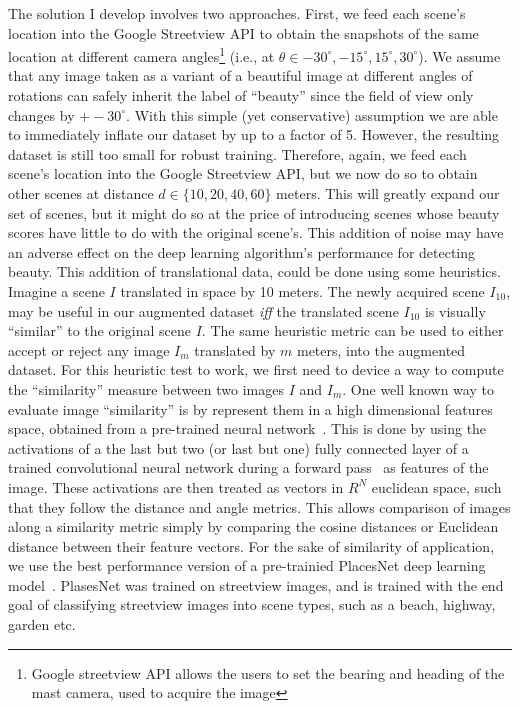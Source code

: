 The solution I develop involves two approaches. First, we feed each scene's location into the Google Streetview API to obtain the snapshots of the same location at different camera angles\footnote{Google streetview API allows the users to set the bearing and heading of the mast camera, used to acquire the image} (i.e., at $\theta \in {-30^{\circ}, -15^{\circ} , 15^{\circ} , 30^{\circ} }$). We assume that any image taken as a variant of a beautiful image at different angles of rotations can safely inherit the label of ``beauty'' since the field of view only changes by $+- 30^\circ $. With this simple (yet conservative) assumption we are able to immediately inflate our dataset by up to a factor of 5.
However, the resulting dataset is still too small for robust training. Therefore, again, we feed each scene's location into the Google Streetview API, but we now do so to obtain other scenes at  distance $d \in \{10,20,40,60\}$ meters.  This will greatly expand our set of scenes, but it might do so at the price of introducing scenes whose beauty scores have little to do with the original scene's. 
This addition of noise may have an adverse effect on the deep learning algorithm's performance for detecting beauty. 
This addition of translational data, could be done using some heuristics. Imagine a scene $I$ translated in space by 10 meters. The newly acquired scene $I_{10}$, may be useful in our augmented dataset \textit{iff} the translated scene $I_{10}$ is visually ``similar'' to the original scene $I$. The same heuristic metric can be used to either accept or reject any image $I_{m}$ translated by $m$ meters, into the augmented dataset. 
For this heuristic test to work, we first need to device a way to compute the ``similarity'' measure between two images $I$ and $I_{m}$. 
One well known way to evaluate image ``similarity'' is by represent them in a high dimensional features space, obtained from a pre-trained neural network~\cite{zhang2018unreasonable}. This is done by using the activations of a the last but two (or last but one) fully connected layer of a trained convolutional neural network during a forward pass~\cite{babenko2015aggregating,Lin_2015_CVPR_Workshops,varga2016fast} as features of the image. These activations are then treated as vectors in $R^N$ euclidean space, such that they follow the distance and angle metrics. This allows comparison of images along a similarity metric simply by comparing the cosine distances or Euclidean distance between their feature vectors. For the sake of similarity of application, we use the best performance version of a pre-trainied PlacesNet deep learning model~\cite{zhou2014learning}. PlasesNet was trained on streetview images, and is trained with the end goal of classifying streetview images into scene types, such as a beach, highway, garden etc. 


